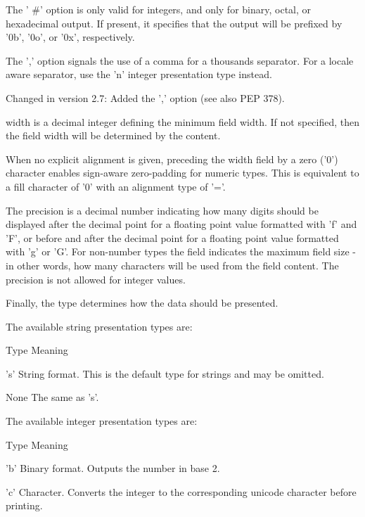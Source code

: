The ' $  \#  $' option is only valid for integers, and only for binary, octal, or hexadecimal output. If present, it specifies that the output will be prefixed by '0b', '0o', or '0x', respectively. \par
The ',' option signals the use of a comma for a thousands separator. For a locale aware separator, use the 'n' integer presentation type instead. \par
Changed in version 2.7: Added the ',' option (see also PEP 378). \par
width is a decimal integer defining the minimum field width. If not specified, then the field width will be determined by the content. \par
When no explicit alignment is given, preceding the width field by a zero ('0') character enables sign-aware zero-padding for numeric types. This is equivalent to a fill character of '0' with an alignment type of '='. \par
The precision is a decimal number indicating how many digits should be displayed after the decimal point for a floating point value formatted with 'f' and 'F', or before and after the decimal point for a floating point value formatted with 'g' or 'G'. For non-number types the field indicates the maximum field size - in other words, how many characters will be used from the field content. The precision is not allowed for integer values. \par
Finally, the type determines how the data should be presented. \par
The available string presentation types are: \par
Type \hspace*{0.5in} Meaning \par
's' \hspace*{0.5in} String format. This is the default type for strings and may be omitted. \par
None \hspace*{0.5in} The same as 's'. \par
The available integer presentation types are: \par
Type \hspace*{0.5in} Meaning \par
'b' \hspace*{0.5in} Binary format. Outputs the number in base 2. \par
'c' \hspace*{0.5in} Character. Converts the integer to the corresponding unicode character before printing. \par
